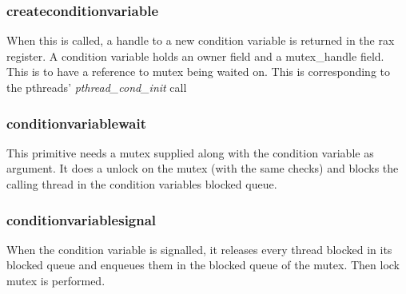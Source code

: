 \subsubsection*{createconditionvariable}
When this is called, a handle to a new condition variable is returned in the rax register. A condition variable holds an owner field and a mutex\_handle field. This is to have a reference to mutex being waited on.
This is corresponding to the pthreads' \emph{pthread\_cond\_init} call
\subsubsection*{conditionvariablewait}
This primitive needs a mutex supplied along with the condition variable as argument. It does a unlock on the mutex (with the same checks) and blocks the calling thread in the condition variables blocked queue.
\subsubsection*{conditionvariablesignal}
When the condition variable is signalled, it releases every thread blocked in its blocked queue and enqueues them in the blocked queue of the mutex. Then lock mutex is performed.




